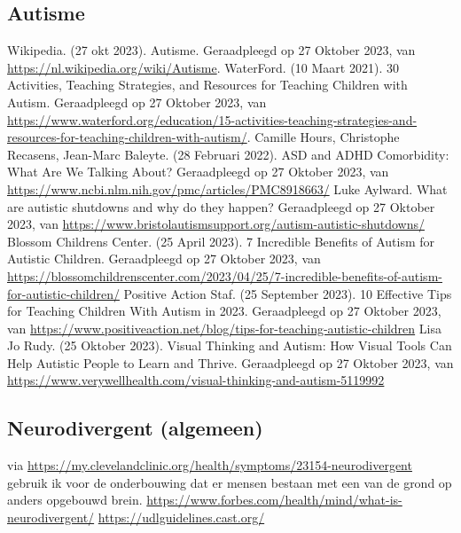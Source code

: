 \documentclass{article}
\begin{document}
\begin{thebibliography}{9}
        \item[\bigskip\subsection*{Autisme}]
                Wikipedia. (27 okt 2023). Autisme. Geraadpleegd op 27 Oktober 2023, van \url{https://nl.wikipedia.org/wiki/Autisme}.
                WaterFord. (10 Maart 2021). 30 Activities, Teaching Strategies, and Resources for Teaching Children with Autism. Geraadpleegd op 27 Oktober 2023, van \url{https://www.waterford.org/education/15-activities-teaching-strategies-and-resources-for-teaching-children-with-autism/}.
                Camille Hours, Christophe Recasens, Jean-Marc Baleyte. (28 Februari 2022). ASD and ADHD Comorbidity: What Are We Talking About? Geraadpleegd op 27 Oktober 2023, van \url{https://www.ncbi.nlm.nih.gov/pmc/articles/PMC8918663/}
                Luke Aylward. What are autistic shutdowns and why do they happen? Geraadpleegd op 27 Oktober 2023, van \url{https://www.bristolautismsupport.org/autism-autistic-shutdowns/}
                Blossom Childrens Center. (25 April 2023). 7 Incredible Benefits of Autism for Autistic Children. Geraadpleegd op 27 Oktober 2023, van \url{https://blossomchildrenscenter.com/2023/04/25/7-incredible-benefits-of-autism-for-autistic-children/}
                Positive Action Staf. (25 September 2023). 10 Effective Tips for Teaching Children With Autism in 2023. Geraadpleegd op 27 Oktober 2023, van \url{https://www.positiveaction.net/blog/tips-for-teaching-autistic-children}
                Lisa Jo Rudy. (25 Oktober 2023). Visual Thinking and Autism: How Visual Tools Can Help Autistic People to Learn and Thrive. Geraadpleegd op 27 Oktober 2023, van \url{https://www.verywellhealth.com/visual-thinking-and-autism-5119992}

        \item[\bigskip\subsection*{Neurodivergent (algemeen)}]
                via \url{https://my.clevelandclinic.org/health/symptoms/23154-neurodivergent} gebruik ik voor de onderbouwing dat er mensen bestaan met een van de grond op anders opgebouwd brein.
                \url{https://www.forbes.com/health/mind/what-is-neurodivergent/}
                \url{https://udlguidelines.cast.org/}
        \newpage        


\end{thebibliography}
\end{document}
